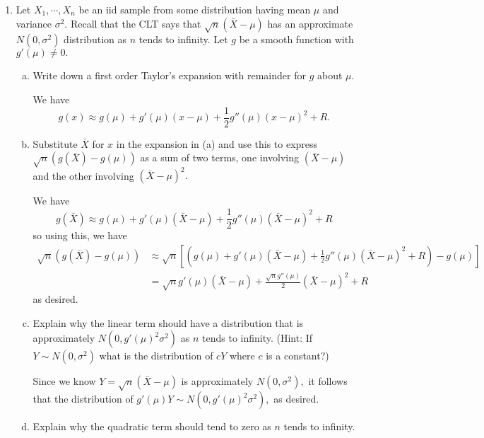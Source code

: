 \documentclass{article}
\begin{document}
\begin{enumerate}
\begin{proof}
		\end{proof}

		\newpage
	\item Let $X_1,\cdots, X_n$ be an iid sample from some distribution having mean $\mu$ and variance $\sigma^2.$ Recall that the CLT says that $\sqrt{n}(\bar{X}-\mu)$ has an approximate $N(0, \sigma^2)$ distribution as $n$ tends to infinity. Let $g$ be a smooth function with $g'(\mu)\neq 0.$ 
		\begin{enumerate}[(a)]
			\item Write down a first order Taylor's expansion with remainder for $g$ about $\mu.$
				\begin{soln}
					We have \[g(x) \approx g(\mu)+g'(\mu)(x-\mu)+\frac{1}{2}g''(\mu)(x-\mu)^2 + R.\]
				\end{soln}

			\item Substitute $\bar{X}$ for $x$ in the expansion in (a) and use this to express $\sqrt{n}(g(\bar{X})-g(\mu))$ as a sum of two terms, one involving $(\bar{X}-\mu)$ and the other involving $(\bar{X}-\mu)^2.$
				\begin{soln}
					We have \[g(\bar{X}) \approx g(\mu)+g'(\mu)(\bar{X}-\mu) + \frac{1}{2}g''(\mu)(\bar{X}-\mu)^2 + R\] so using this, we have 
					\begin{align*}
						\sqrt{n}(g(\bar{X})-g(\mu)) &\approx \sqrt{n}\left[\left(  g(\mu)+g'(\mu)(\bar{X}-\mu) + \frac{1}{2}g''(\mu)(\bar{X}-\mu)^2 + R\right)-g(\mu)\right] \\
						&= \sqrt{n}g'(\mu)(\bar{X}-\mu) + \frac{\sqrt{n}g''(\mu)}{2}(\bar{X}-\mu)^2 + R
					\end{align*}
					as desired.

				\end{soln}

			\item Explain why the linear term should have a distribution that is approximately $N(0, g'(\mu)^2\sigma^2)$ as $n$ tends to infinity. (Hint: If $Y\sim N(0, \sigma^2)$ what is the distribution of $cY$ where $c$ is a constant?)
				\begin{soln}
					Since we know $Y=\sqrt{n}(\bar{X}-\mu)$ is approximately $N(0, \sigma^2),$ it follows that the distribution of $g'(\mu)Y\sim N(0, g'(\mu)^2\sigma^2),$ as desired.

				\end{soln}

			\item Explain why the quadratic term should tend to zero as $n$ tends to infinity.
				

\end{enumerate}
\end{enumerate}
\end{document}
